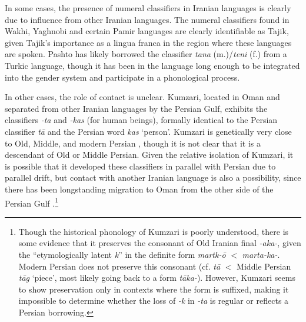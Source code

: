 \documentclass[11pt]{article}
\begin{document}
In some cases, the presence of numeral classifiers in Iranian languages is clearly due to influence from other Iranian languages. 
The numeral classifiers found in Wakhi, Yaghnobi and certain Pamir languages are clearly identifiable as Tajik, given Tajik's importance as a lingua franca in the region where these languages are spoken. 
Pashto has likely borrowed the classifier {\it tana} (m.)/{\it teni} (f.) from a Turkic language, though it has been in the language long enough to be integrated into the gender system and participate in a phonological process. 

In other cases, the role of contact is unclear. Kumzari, located in Oman and separated from other Iranian languages by the Persian Gulf, exhibits the classifiers {\it -ta} and {\it -kas} (for human beings), formally identical to the Persian classifier {\it t\=a} and the Persian word {\it kas} `person'. Kumzari is genetically very close to Old, Middle, and modern Persian \citep{Skjaervo1989b}, though it is not clear that it is a descendant of Old or Middle Persian. Given the relative isolation of Kumzari, it is possible that it developed these classifiers in parallel with Persian due to parallel drift, %
but contact with another Iranian language is also a possibility, since there has been longstanding migration to Oman from the other side of the Persian Gulf \citep{Barth1983}.\footnote{Though the historical phonology of Kumzari is poorly understood, there is some evidence that it preserves the consonant of Old Iranian final {\it *-aka-}, given the ``etymologically latent {\it k}'' in the definite form {\it martk-\=o} \citep[38]{WalAnonby2015} $<$ {\it *marta-ka-}. Modern Persian does not preserve this consonant (cf. {\it t\=a} $<$ Middle Persian {\it t\=ag} `piece', most likely going back to a form {\it *t\=aka-}). However, Kumzari seems to show preservation only in contexts where the form is suffixed, making it impossible to determine whether the loss of {\it -k} in {\it -ta} is regular or reflects a Persian borrowing.} 
\end{document}
